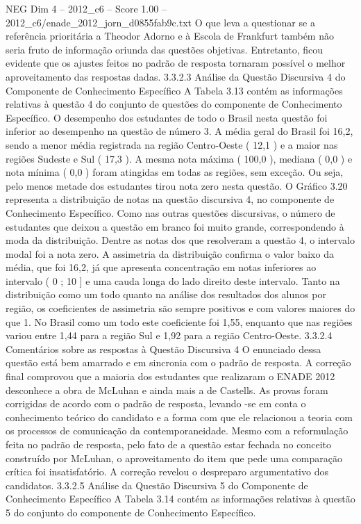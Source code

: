 \begin{textsample}{NEG Dim 4 – 2012\_c6 – Score 1.00 – 2012\_c6/enade\_2012\_jorn\_d0855fab9c.txt}
O que leva a questionar se a referência prioritária a Theodor Adorno e à Escola de Frankfurt também não seria fruto de informação oriunda das questões objetivas.
Entretanto, ficou evidente que os ajustes feitos no padrão de resposta tornaram possível o melhor aproveitamento das respostas dadas. 3.3.2.3 Análise da Questão Discursiva 4 do Componente de Conhecimento Específico A Tabela 3.13 contém as informações relativas à questão 4 do conjunto de questões do componente de Conhecimento Específico.
O desempenho dos estudantes de todo o Brasil nesta questão foi inferior ao desempenho na questão de número 3.
A média geral do Brasil foi 16,2, sendo a menor média registrada na região Centro-Oeste ( 12,1 ) e a maior nas regiões Sudeste e Sul ( 17,3 ).
A mesma nota máxima ( 100,0 ), mediana ( 0,0 ) e nota mínima ( 0,0 ) foram atingidas em todas as regiões, sem exceção.
Ou seja, pelo menos metade dos estudantes tirou nota zero nesta questão.
O Gráfico 3.20 representa a distribuição de notas na questão discursiva 4, no componente de Conhecimento Específico.
Como nas outras questões discursivas, o número de estudantes que deixou a questão em branco foi muito grande, correspondendo à moda da distribuição.
Dentre as notas dos que resolveram a questão 4, o intervalo modal foi a nota zero.
A assimetria da distribuição confirma o valor baixo da média, que foi 16,2, já que apresenta concentração em notas inferiores ao intervalo ( 0 ; 10 ] e uma cauda longa do lado direito deste intervalo.
Tanto na distribuição como um todo quanto na análise dos resultados dos alunos por região, os coeficientes de assimetria são sempre positivos e com valores maiores do que 1.
No Brasil como um todo este coeficiente foi 1,55, enquanto que nas regiões variou entre 1,44 para a região Sul e 1,92 para a região Centro-Oeste. 3.3.2.4 Comentários sobre as respostas à Questão Discursiva 4 O enunciado dessa questão está bem amarrado e em sincronia com o padrão de resposta.
A correção final comprovou que a maioria dos estudantes que realizaram o ENADE 2012 desconhece a obra de McLuhan e ainda mais a de Castells.
As provas foram corrigidas de acordo com o padrão de resposta, levando -se em conta o conhecimento teórico do candidato e a forma com que ele relacionou a teoria com os processos de comunicação da contemporaneidade.
Mesmo com a reformulação feita no padrão de resposta, pelo fato de a questão estar fechada no conceito construído por McLuhan, o aproveitamento do item que pede uma comparação crítica foi insatisfatório.
A correção revelou o despreparo argumentativo dos candidatos. 3.3.2.5 Análise da Questão Discursiva 5 do Componente de Conhecimento Específico A Tabela 3.14 contém as informações relativas à questão 5 do conjunto do componente de Conhecimento Específico.

\end{textsample}
